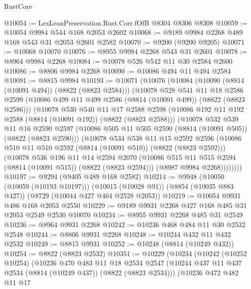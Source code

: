 \begin{lexlean}{RustCore}
\begin{coremodule}
@10054 := LexLeanPreservation.Rust.Corr.fOfB @8304 @8306 @8308
@10059 := @10054 @9984 @544 @168 @2053 @2602
@10068 := @9189 @9984 @2268 @489 @168 @543 @31 @2053 @2601 @2582
@10070 := @9200 (@9200 @9205)
@10071 := @10068 @10070
@10076 := @8955 @9984 @2268 @543 @31 @2601
@10078 := @8964 @9984 @2268
@10084 := @10078 @526 @542 @11 @30 @2584 @2600
@10086 := @8806 @9984 @2268
@10090 := @10086 @494 @11 @494 @2584
@10091 := @8815 @9984
@10193 := @10071
    (@10076
      (@10084
        (@10090 (@8814 (@10091 @494)) (@8822 (@8823 @2584)))
        (@10078
          @528
          @541
          @11
          @18
          @2586
          @2599
          (@10086 @499 @11 @499 @2586 (@8814 (@10091 @499)) (@8822 (@8823 @2586)))
          (@10078
            @530
            @540
            @11
            @17
            @2588
            @2598
            (@10086 @192 @11 @192 @2588 (@8814 (@10091 @192)) (@8822 (@8823 @2588)))
            (@10078
              @532
              @539
              @11
              @16
              @2590
              @2597
              (@10086 @505 @11 @505 @2590 (@8814 (@10091 @505)) (@8822 (@8823 @2590)))
              (@10078
                @534
                @538
                @11
                @15
                @2592
                @2596
                (@10086 @510 @11 @510 @2592 (@8814 (@10091 @510)) (@8822 (@8823 @2592)))
                (@10078
                  @536
                  @196
                  @11
                  @14
                  @2594
                  @2070
                  (@10086 @515 @11 @515 @2594 (@8814 (@10091 @515)) (@8822 (@8823 @2594)))
                  (@8987 @9984 @2268))))))))
@10197 := @9294 (@9405 @489 @168 @2582)
@10214 := @9948
    (@10050 (@10059 (@10193 @10197)))
    (@10015 (@10028 @91))
    (@8854 (@10035 @883 @427))
    (@8729 (@10044 @427 @464 @2528 @2053))
@10219 := @10054 @9931 @486 @168 @2053 @2550
@10229 := @9189 @9931 @2268 @427 @168 @485 @31 @2053 @2549 @2530 @10070
@10234 := @8955 @9931 @2268 @485 @31 @2549
@10236 := @8964 @9931 @2268
@10242 := @10236 @468 @484 @11 @30 @2532 @2548
@10244 := @8806 @9931 @2268
@10248 := @10244 @432 @11 @432 @2532
@10249 := @8815 @9931
@10252 := @10248 (@8814 (@10249 @432))
@10254 := @8822 (@8823 @2532)
@10351 := @10229
    (@10234
      (@10242
        (@10252 @10254)
        (@10236
          @470
          @483
          @11
          @18
          @2534
          @2547
          (@10244 @437 @11 @437 @2534 (@8814 (@10249 @437)) (@8822 (@8823 @2534)))
          (@10236
            @472
            @482
            @11
            @17

\end{coremodule}
\end{lexlean}
